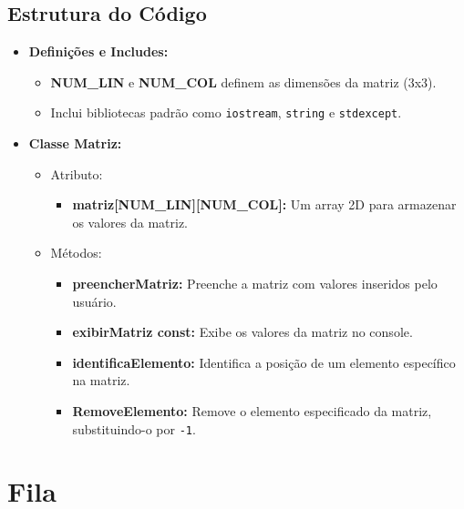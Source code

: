 \documentclass{article}
\begin{document}
\subsection*{Estrutura do Código}
\begin{itemize}
    \item \textbf{Definições e Includes:}
    \begin{itemize}
        \item \textbf{NUM\_LIN} e \textbf{NUM\_COL} definem as dimensões da matriz (3x3).
        \item Inclui bibliotecas padrão como \texttt{iostream}, \texttt{string} e \texttt{stdexcept}.
    \end{itemize}
    \item \textbf{Classe Matriz:}
    \begin{itemize}
        \item Atributo:
        \begin{itemize}
            \item \textbf{matriz[NUM\_LIN][NUM\_COL]:} Um array 2D para armazenar os valores da matriz.
        \end{itemize}
        \item Métodos:
        \begin{itemize}
            \item \textbf{preencherMatriz:} Preenche a matriz com valores inseridos pelo usuário.
            \item \textbf{exibirMatriz const:} Exibe os valores da matriz no console.
            \item \textbf{identificaElemento:} Identifica a posição de um elemento específico na matriz.
            \item \textbf{RemoveElemento:} Remove o elemento especificado da matriz, substituindo-o por \texttt{-1}.
        \end{itemize}
    \end{itemize}
\end{itemize}

\section*{Fila}
\end{document}

